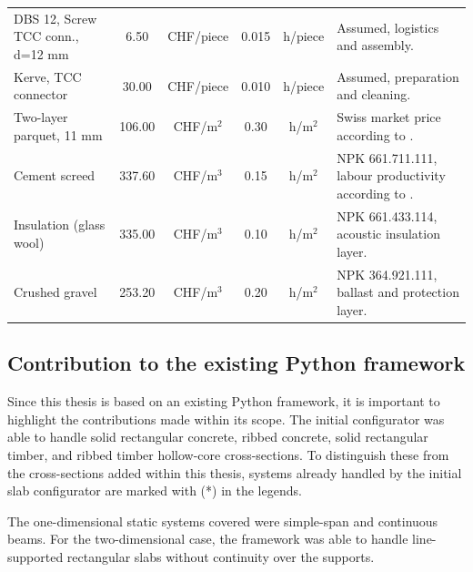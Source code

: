 \begin{table}[h]
\begin{tabularx}{\textwidth}{@{}X|c|c|c|c|X@{}}
    DBS 12, Screw TCC conn., d=12 mm &
    6.50 & CHF/piece & 0.015 & h/piece &
    Assumed, logistics and assembly. \\

    Kerve, TCC connector &
    30.00 & CHF/piece & 0.010 & h/piece &
    Assumed, preparation and cleaning. \\

    Two-layer parquet, 11 mm &
    106.00 & CHF/m$^2$ & 0.30 & h/m$^2$ &
    Swiss market price according to \cite{Bodenleger2026}. \\

    Cement screed &
    337.60 & CHF/m$^3$ & 0.15 & h/m$^2$ &
    NPK 661.711.111, labour productivity according to \cite{Steelmonks2026}. \\

    Insulation (glass wool) &
    335.00 & CHF/m$^3$ & 0.10 & h/m$^2$ &
    NPK 661.433.114, acoustic insulation layer. \\

    Crushed gravel &
    253.20 & CHF/m$^3$ & 0.20 & h/m$^2$ &
    NPK 364.921.111, ballast and protection layer. \\ \hline
    \end{tabularx}
    \endgroup
    
\end{table}

\subsection{Contribution to the existing Python framework}
Since this thesis is based on an existing Python framework, it is important to highlight the contributions made within its scope. 
The initial configurator was able to handle solid rectangular concrete, ribbed concrete, solid rectangular timber, and ribbed timber hollow-core cross-sections. To distinguish these from the cross-sections added within this thesis, systems already handled by the initial slab configurator are marked with (*) in the legends.

The one-dimensional static systems covered were simple-span and continuous beams. For the two-dimensional case, the framework was able to handle line-supported rectangular slabs without continuity over the supports.

